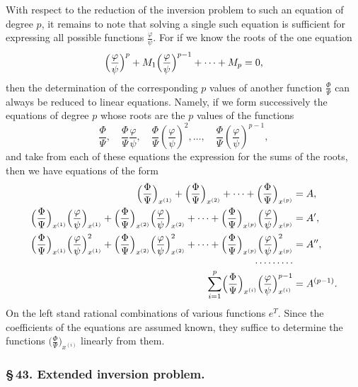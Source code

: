 \documentclass[10pt]{article}
\begin{document}
With respect to the reduction of the inversion problem to such an equation of degree \(p\), it remains to note that solving a single such equation is sufficient for expressing all possible functions \(\frac{\varphi}{\psi}\). For if we know the roots of the one equation
\[
\Bigl(\frac{\varphi}{\psi}\Bigr)^p+M_1\Bigl(\frac{\varphi}{\psi}\Bigr)^{p-1}+\cdots+M_p=0,
\]
then the determination of the corresponding \(p\) values of another function \(\frac{\Phi}{\Psi}\) can always be reduced to linear equations. Namely, if we form successively the equations of degree \(p\) whose roots are the \(p\) values of the functions
\[
\frac{\Phi}{\Psi},\quad \frac{\Phi}{\Psi}\frac{\varphi}{\psi},\quad
\frac{\Phi}{\Psi}\left(\frac{\varphi}{\psi}\right)^2,
\ldots,\quad
\frac{\Phi}{\Psi}\left(\frac{\varphi}{\psi}\right)^{p-1},
\]
and take from each of these equations the expression for the sums of the roots, then we have equations of the form
\[
\begin{aligned}
\Bigl(\frac{\Phi}{\Psi}\Bigr)_{x^{(1)}}+\Bigl(\frac{\Phi}{\Psi}\Bigr)_{x^{(2)}}+\cdots+\Bigl(\frac{\Phi}{\Psi}\Bigr)_{x^{(p)}}&=A,\\
\Bigl(\frac{\Phi}{\Psi}\Bigr)_{x^{(1)}}\Bigl(\frac{\varphi}{\psi}\Bigr)_{x^{(1)}}+\Bigl(\frac{\Phi}{\Psi}\Bigr)_{x^{(2)}}\Bigl(\frac{\varphi}{\psi}\Bigr)_{x^{(2)}}+\cdots+\Bigl(\frac{\Phi}{\Psi}\Bigr)_{x^{(p)}}\Bigl(\frac{\varphi}{\psi}\Bigr)_{x^{(p)}}&=A',\\
\Bigl(\frac{\Phi}{\Psi}\Bigr)_{x^{(1)}}\Bigl(\frac{\varphi}{\psi}\Bigr)_{x^{(1)}}^{2}+\Bigl(\frac{\Phi}{\Psi}\Bigr)_{x^{(2)}}\Bigl(\frac{\varphi}{\psi}\Bigr)_{x^{(2)}}^{2}+\cdots+\Bigl(\frac{\Phi}{\Psi}\Bigr)_{x^{(p)}}\Bigl(\frac{\varphi}{\psi}\Bigr)_{x^{(p)}}^{2}&=A'',\\[-0.3em]
\cdots\cdots\cdots&\\[-0.3em]
\sum_{i=1}^{p}\Bigl(\frac{\Phi}{\Psi}\Bigr)_{x^{(i)}}\Bigl(\frac{\varphi}{\psi}\Bigr)_{x^{(i)}}^{p-1}&=A^{(p-1)}.
\end{aligned}
\]
On the left stand rational combinations of various functions \(e^T\). Since the coefficients of the equations are assumed known, they suffice to determine the functions \(\bigl(\frac{\Phi}{\Psi}\bigr)_{x^{(i)}}\) linearly from them.

\subsubsection*{\S\,43. Extended inversion problem.}
\end{document}

